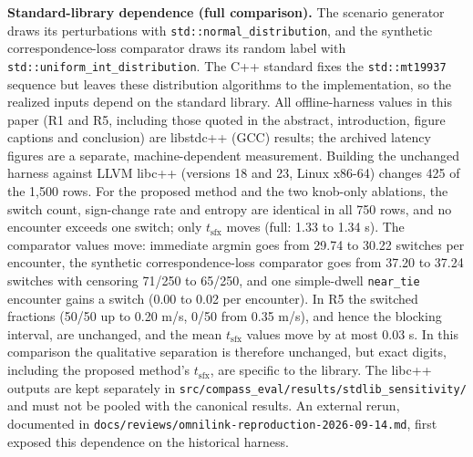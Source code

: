 \documentclass[11pt]{article}
\newcommand{\code}[1]{\texttt{#1}}
\begin{document}
\textbf{Standard-library dependence (full comparison).} The scenario generator draws its perturbations with \code{std::\allowbreak normal\_distribution}, and the synthetic correspondence-loss comparator draws its random label with \code{std::\allowbreak uniform\_int\_distribution}. The C++ standard fixes the \code{std::\allowbreak mt19937} sequence but leaves these distribution algorithms to the implementation, so the realized inputs depend on the standard library. All offline-harness values in this paper (R1 and R5, including those quoted in the abstract, introduction, figure captions and conclusion) are libstdc++ (GCC) results; the archived latency figures are a separate, machine-dependent measurement. Building the unchanged harness against LLVM libc++ (versions 18 and 23, Linux x86-64) changes 425 of the 1,500 rows. For the proposed method and the two knob-only ablations, the switch count, sign-change rate and entropy are identical in all 750 rows, and no encounter exceeds one switch; only $t_{\text{sfx}}$ moves (full: 1.33 to 1.34 s). The comparator values move: immediate argmin goes from 29.74 to 30.22 switches per encounter, the synthetic correspondence-loss comparator goes from 37.20 to 37.24 switches with censoring 71/250 to 65/250, and one simple-dwell \code{near\_tie} encounter gains a switch (0.00 to 0.02 per encounter). In R5 the switched fractions (50/50 up to 0.20 m/s, 0/50 from 0.35 m/s), and hence the blocking interval, are unchanged, and the mean $t_{\text{sfx}}$ values move by at most 0.03 s. In this comparison the qualitative separation is therefore unchanged, but exact digits, including the proposed method's $t_{\text{sfx}}$, are specific to the library. The libc++ outputs are kept separately in \code{src/compass\_eval/results/stdlib\_sensitivity/} and must not be pooled with the canonical results. An external rerun, documented in \code{docs/reviews/omnilink-reproduction-2026-09-14.md}, first exposed this dependence on the historical harness.
\end{document}
